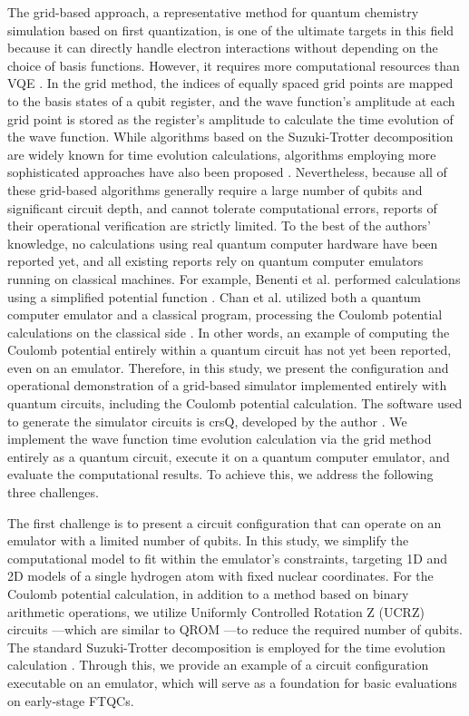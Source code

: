 \documentclass[report_2025.tex]{subfiles}
\begin{document}
The grid-based approach, a representative method for quantum chemistry
simulation based on first quantization, is one of the ultimate targets in this
field because it can directly handle electron interactions without depending on
the choice of basis functions. However, it requires more computational resources
than VQE \cite{kassal2008.pnas.0808245105}. In the grid method, the indices of
equally spaced grid points are mapped to the basis states of a qubit register,
and the wave function's amplitude at each grid point is stored as the register's
amplitude to calculate the time evolution of the wave function. While algorithms
based on the Suzuki-Trotter decomposition are widely known for time evolution
calculations, algorithms employing more sophisticated approaches have also been
proposed \cite{Berry2015.PhysRevLett.114.090502, Babbush_2019,
YuanSu.PRXQuantum.2.040332}. Nevertheless, because all of these grid-based
algorithms generally require a large number of qubits and significant circuit
depth, and cannot tolerate computational errors, reports of their operational
verification are strictly limited. To the best of the authors' knowledge, no
calculations using real quantum computer hardware have been reported yet, and
all existing reports rely on quantum computer emulators running on classical
machines. For example, Benenti et al. performed calculations using a simplified
potential function \cite{Benenti2008.10.1119/1.2894532}. Chan et al. utilized
both a quantum computer emulator and a classical program, processing the Coulomb
potential calculations on the classical side \cite{Chan2023.sciadv.abo7484}. In
other words, an example of computing the Coulomb potential entirely within a
quantum circuit has not yet been reported, even on an emulator. Therefore, in
this study, we present the configuration and operational demonstration of a
grid-based simulator implemented entirely with quantum circuits, including the
Coulomb potential calculation. The software used to generate the simulator
circuits is crsQ, developed by the author
\cite{takahashi2024.doi:10.1021/acs.jctc.4c00708}. We implement the wave
function time evolution calculation via the grid method entirely as a quantum
circuit, execute it on a quantum computer emulator, and evaluate the
computational results. To achieve this, we address the following three
challenges.

The first challenge is to present a circuit configuration that can operate on an
emulator with a limited number of qubits. In this study, we simplify the
computational model to fit within the emulator's constraints, targeting 1D and
2D models of a single hydrogen atom with fixed nuclear coordinates. For the
Coulomb potential calculation, in addition to a method based on binary
arithmetic operations, we utilize Uniformly Controlled Rotation Z (UCRZ)
circuits \cite{Mottonen2004.PhysRevLett.93.130502}---which are similar to QROM
\cite{Babbush_2018b.PhysRevX.8.041015}---to reduce the required number of qubits.
The standard Suzuki-Trotter decomposition is employed for the time evolution
calculation \cite{Zalka-rspa.1998.0162}. Through this, we provide an example of
a circuit configuration executable on an emulator, which will serve as a
foundation for basic evaluations on early-stage FTQCs.
\end{document}

